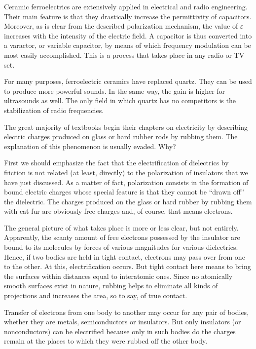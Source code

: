 Ceramic ferroelectrics are extensively applied in electrical and radio engineering. Their main feature is that they drastically increase the permittivity of capacitors. Moreover, as is clear from the described polarization mechanism, the value of $\varepsilon$ increases with the intensity of the electric field. A capacitor is thus converted into a varactor, or variable capacitor, by means of which frequency modulation can be most easily accomplished. This is a process that takes place in any radio or TV set.

For many purposes, ferroelectric ceramics have replaced quartz. They can be used to produce more powerful sounds. In the same way, the gain is higher for ultrasounds as well. The only field in which quartz has no competitors is the stabilization of radio frequencies.

The great majority of textbooks begin their chapters on electricity by describing electric charges produced on glass or hard rubber rods by rubbing them. The explanation of this phenomenon is usually evaded. Why?

First we should emphasize the fact that the electrification of dielectrics by friction is not related (at least, directly) to the polarization of insulators that we have just discussed. As a matter of fact, polarization consists in the formation of bound electric charges whose special feature is that they cannot be ``drawn off'' the dielectric. The charges produced on the glass or hard rubber by rubbing them with cat fur are obviously free charges and, of course, that means electrons.

The general picture of what takes place is more or less clear, but not entirely. Apparently, the scanty amount of free electrons possessed by the insulator are bound to its molecules by forces of various magnitudes for various dielectrics. Hence, if two bodies are held in tight contact, electrons may pass over from one to the other. At this, electrification occurs. But tight contact here means to bring the surfaces within distances equal to interatomic ones. Since no atomically smooth surfaces exist in nature, rubbing helps to eliminate all kinds of projections and increases the area, so to say, of true contact.

Transfer of electrons from one body to another may occur for any pair of bodies, whether they are metals, semiconductors or insulators. But only insulators (or nonconductors) can be electrified because only in such bodies do the charges remain at the places to which they were rubbed off the other body.

